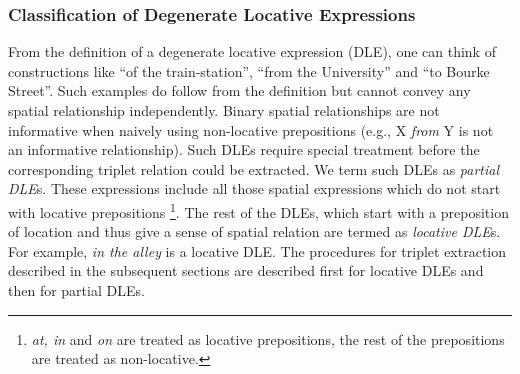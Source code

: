 \documentclass[letter]{sig-alternate}
\begin{document}
\subsubsection*{Classification of Degenerate Locative Expressions}
From the definition of a degenerate locative expression (DLE), one can think of constructions like ``of the train-station'', ``from the University'' and ``to Bourke Street''. Such examples do follow from the definition but cannot convey any spatial relationship independently. Binary spatial relationships are not informative when naively using non-locative prepositions (e.g., X \textit{from} Y is not an informative relationship). Such DLEs require special treatment before the corresponding triplet relation could be extracted. We term such DLEs as \textit{partial DLE}s. These expressions include all those spatial expressions which do not start with locative prepositions
\footnote{
\textit{at, in} and \textit{on} are treated as locative prepositions, the rest of the prepositions are treated as non-locative.
}.
The rest of the DLEs, which start with a preposition of location and thus give a sense of spatial relation are termed as \textit{locative DLE}s. For example, \textit{in the alley} is a locative DLE. The procedures for triplet extraction described in the subsequent sections are described first for locative DLEs and then for partial DLEs.
\end{document}
